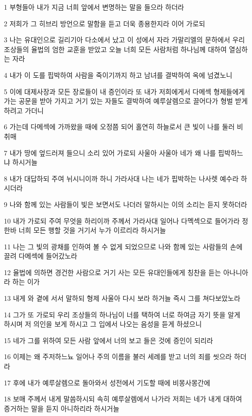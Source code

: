 \par 1 부형들아 내가 지금 너희 앞에서 변명하는 말을 들으라 하더라
\par 2 저희가 그 히브리 방언으로 말함을 듣고 더욱 종용한지라 이어 가로되
\par 3 나는 유대인으로 길리기아 다소에서 났고 이 성에서 자라 가말리엘의 문하에서 우리 조상들의 율법의 엄한 교훈을 받았고 오늘 너희 모든 사람처럼 하나님께 대하여 열심하는 자라
\par 4 내가 이 도를 핍박하여 사람을 죽이기까지 하고 남녀를 결박하여 옥에 넘겼노니
\par 5 이에 대제사장과 모든 장로들이 내 증인이라 또 내가 저희에게서 다메섹 형제들에게 가는 공문을 받아 가지고 거기 있는 자들도 결박하여 예루살렘으로 끌어다가 형벌 받게 하려고 가더니
\par 6 가는데 다메섹에 가까왔을 때에 오정쯤 되어 홀연히 하늘로서 큰 빛이 나를 둘러 비취매
\par 7 내가 땅에 엎드러져 들으니 소리 있어 가로되 사울아 사울아 네가 왜 나를 핍박하느냐 하시거늘
\par 8 내가 대답하되 주여 뉘시니이까 하니 가라사대 나는 네가 핍박하는 나사렛 예수라 하시더라
\par 9 나와 함께 있는 사람들이 빛은 보면서도 나더러 말하시는 이의 소리는 듣지 못하더라
\par 10 내가 가로되 주여 무엇을 하리이까 주께서 가라사대 일어나 다멕섹으로 들어가라 정한바 너희 모든 행할 것을 거기서 누가 이르리라 하시거늘
\par 11 나는 그 빛의 광채를 인하여 볼 수 없게 되었으므로 나와 함께 있는 사람들의 손에 끌려 다메섹에 들어갔노라
\par 12 율법에 의하면 경건한 사람으로 거기 사는 모든 유대인들에게 칭찬을 듣는 아나니아라 하는 이가
\par 13 내게 와 곁에 서서 말하되 형제 사울아 다시 보라 하거늘 즉시 그를 쳐다보았노라
\par 14 그가 또 가로되 우리 조상들의 하나님이 너를 택하여 너로 하여금 자기 뜻을 알게 하시며 저 의인을 보게 하시고 그 입에서 나오는 음성을 듣게 하셨으니
\par 15 네가 그를 위하여 모든 사람 앞에서 너의 보고 들은 것에 증인이 되리라
\par 16 이제는 왜 주저하느뇨 일어나 주의 이름을 불러 세례를 받고 너의 죄를 씻으라 하더라
\par 17 후에 내가 예루살렘으로 돌아와서 성전에서 기도할 때에 비몽사몽간에
\par 18 보매 주께서 내게 말씀하시되 속히 예루살렘에서 나가라 저희는 네가 내게 대하여 증거하는 말을 듣지 아니하리라 하시거늘
